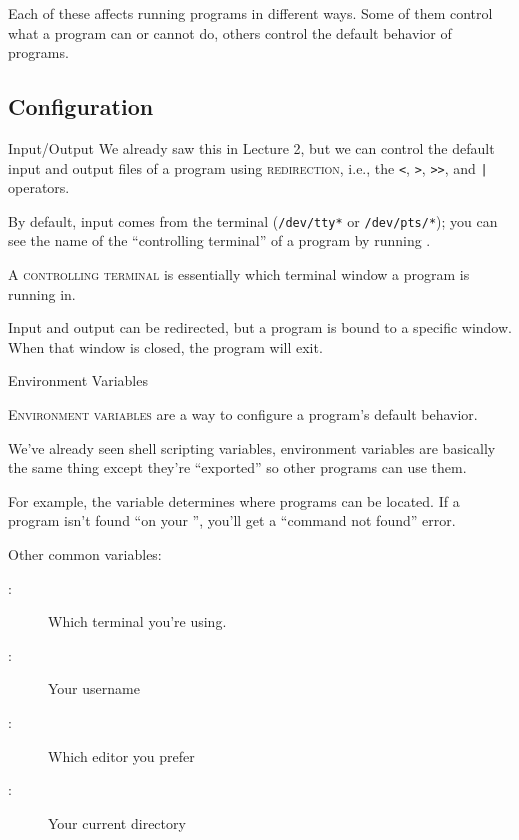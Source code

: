 Each of these affects running programs in different ways.  Some of them control
what a program can or cannot do, others control the default behavior of
programs.

\subsection{Configuration}

\begin{frame}{Input/Output}
  We already saw this in Lecture 2, but we can control the default input and
  output files of a program using \textsc{redirection}, i.e., the \texttt{<},
  \texttt{>}, \texttt{>>}, and \texttt{|} operators.

  \pause

  By default, input comes from the terminal (\texttt{/dev/tty*} or
  \texttt{/dev/pts/*}); you can see the name of the \enquote{controlling
  terminal} of a program by running .

   {
    A \textsc{controlling terminal} is essentially which terminal window a
    program is running in.
  }

  \pause

  Input and output can be redirected, but a program is bound to a specific
  window.  When that window is closed, the program will exit.
\end{frame}

\begin{frame}[fragile]{Environment Variables}

  \textsc{Environment variables} are a way to configure a program's default
  behavior.

  \pause

  We've already seen shell scripting variables, environment variables are
  basically the same thing except they're \enquote{exported} so other programs
  can use them.

  \pause

  For example, the  variable determines where programs can be
  located.  If a program isn't found \enquote{on your }, you'll
  get a \enquote{command not found} error.

  \pause

  Other common variables:
  \begin{description}
    \item[:] Which terminal you're using.
    \item[:] Your username
    \item[:] Which editor you prefer
    \item[:] Your current directory
  \end{description}

\end{frame}

